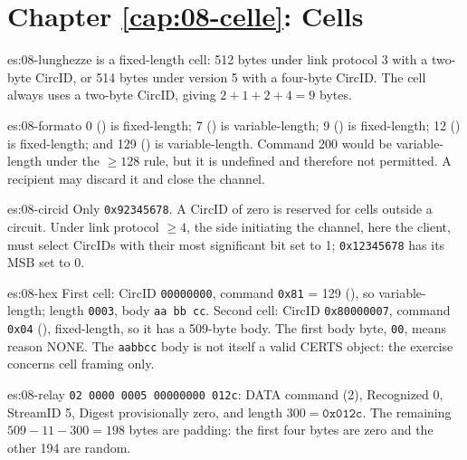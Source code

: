 \section*{Chapter \ref{cap:08-celle}: Cells}

\begin{soluzione}{es:08-lunghezze}
 is a fixed-length cell: 512 bytes under link protocol 3 with a two-byte CircID, or 514 bytes under version 5 with a four-byte CircID. The  cell always uses a two-byte CircID, giving $2 + 1 + 2 + 4 = 9$ bytes.
\end{soluzione}

\begin{soluzione}{es:08-formato}
0 () is fixed-length; 7 () is variable-length; 9 () is fixed-length; 12 () is fixed-length; and 129 () is variable-length. Command 200 would be variable-length under the $\ge 128$ rule, but it is undefined and therefore not permitted. A recipient may discard it and close the channel.
\end{soluzione}

\begin{soluzione}{es:08-circid}
Only \texttt{0x92345678}. A CircID of zero is reserved for cells outside a circuit. Under link protocol $\ge 4$, the side initiating the channel, here the client, must select CircIDs with their most significant bit set to 1; \texttt{0x12345678} has its MSB set to 0.
\end{soluzione}

\begin{soluzione}{es:08-hex}
First cell: CircID \texttt{00000000}, command \texttt{0x81} = 129 (), so variable-length; length \texttt{0003}, body \texttt{aa bb cc}. Second cell: CircID \texttt{0x80000007}, command \texttt{0x04} (), fixed-length, so it has a 509-byte body. The first body byte, \texttt{00}, means reason NONE. The \texttt{aabbcc} body is not itself a valid CERTS object: the exercise concerns cell framing only.
\end{soluzione}

\begin{soluzione}{es:08-relay}
\texttt{02 0000 0005 00000000 012c}: DATA command (2), Recognized 0, StreamID 5, Digest provisionally zero, and length $300 = \texttt{0x012c}$. The remaining $509 - 11 - 300 = 198$ bytes are padding: the first four bytes are zero and the other 194 are random.
\end{soluzione}

